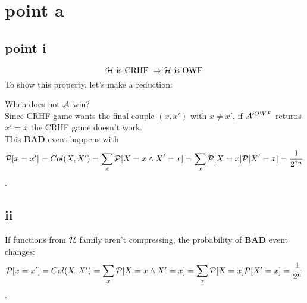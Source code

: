 
\section{point a}
\subsection{point i}%

\[
    \H \text{ is CRHF } \Rightarrow \H \text{ is OWF}
\]
To show this property, let's make a reduction:
\begin{figure}[h!]
   \centering
   \sdinit{}
\end{figure}

When does not $\A$ win?\\
Since CRHF game  wants the final couple $(x, x')$ with $x\not= x'$, if
$\A'^{OWF}$ returns $x'=x$ the CRHF game doesn't work.\\

This \textbf{BAD} event happens with 
\[
    \P [ x=x' ]=Col(X, X')=\sum_{x}^{} \P [ X=x \wedge X'=x ]= \sum_{x}^{} \P [X=x] \P [ X'=x ] = \frac{1}{2^{2n}}        
\].
\subsection{ ii}%

If functions from $\H$ family aren't compressing, the probability of
\textbf{BAD} event changes:
\[
    \P [ x=x' ]=Col(X, X')=\sum_{x}^{} \P [ X=x \wedge X'=x ]= \sum_{x}^{} \P [X=x] \P [ X'=x ] = \frac{1}{2^{n}}        
\].

